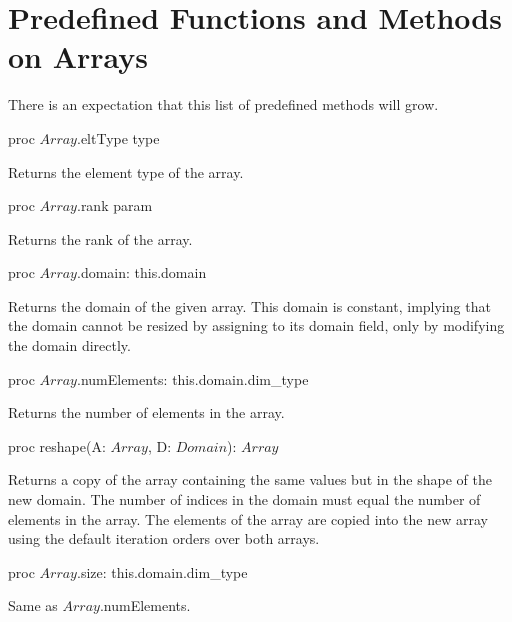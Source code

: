 \section{Predefined Functions and Methods on Arrays}
\label{Predefined_Functions_and_Methods_on_Arrays}

There is an expectation that this list of predefined methods will grow.

\begin{protohead}
proc $Array$.eltType type
\end{protohead}
\begin{protobody}
Returns the element type of the array.
\end{protobody}

\begin{protohead}
proc $Array$.rank param
\end{protohead}
\begin{protobody}
Returns the rank of the array.
\end{protobody}

\begin{protohead}
proc $Array$.domain: this.domain
\end{protohead}
\begin{protobody}
Returns the domain of the given array.  This domain is constant,
implying that the domain cannot be resized by assigning to its domain
field, only by modifying the domain directly.
\end{protobody}

\begin{protohead}
proc $Array$.numElements: this.domain.dim_type
\end{protohead}
\begin{protobody}
Returns the number of elements in the array.
\end{protobody}

\begin{protohead}
proc reshape(A: $Array$, D: $Domain$): $Array$
\end{protohead}
\begin{protobody}
Returns a copy of the array containing the same values but in the
shape of the new domain.  The number of indices in the domain must
equal the number of elements in the array.  The elements of the array
are copied into the new array using the default iteration orders over
both arrays.
\end{protobody}

\begin{protohead}
proc $Array$.size: this.domain.dim_type
\end{protohead}
\begin{protobody}
Same as $Array$.numElements.
\end{protobody}
